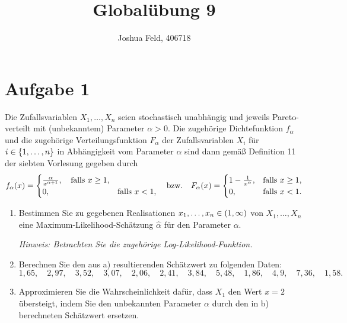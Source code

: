\documentclass{exercise}
\institute{Institut für Statistik und Wirtschaftsmathematik}
\title{Globalübung 9}
\author{Joshua Feld, 406718}
\begin{document}
    \maketitle


    \section*{Aufgabe 1}

    \begin{problem}
        Die Zufallsvariablen \(X_1, \ldots, X_n\) seien stochastisch unabhängig und jeweils Pareto-verteilt mit (unbekanntem) Parameter \(\alpha > 0\).
        Die zugehörige Dichtefunktion \(f_\alpha\) und die zugehörige Verteilungsfunktion \(F_\alpha\) der Zufallsvariablen \(X_i\) für \(i \in \braces*{1, \ldots, n}\) in Abhängigkeit vom Parameter \(\alpha\) sind dann gemäß Definition 11 der siebten Vorlesung gegeben durch
        \[
            f_\alpha\parentheses*{x} = \begin{cases}
                \frac{\alpha}{x^{\alpha + 1}}, \quad \text{falls }x \ge 1,\\
                0, & \text{falls }x < 1,
            \end{cases} \quad \text{bzw.} \quad F_\alpha\parentheses*{x} = \begin{cases}
                1 - \frac{1}{x^\alpha}, & \text{falls }x \ge 1,\\
                0, & \text{falls }x < 1.
            \end{cases}
        \]
        \begin{enumerate}
            \item Bestimmen Sie zu gegebenen Realisationen \(x_1, \ldots, x_n \in \parentheses*{1, \infty}\) von \(X_1, \ldots, X_n\) eine Maximum-Likelihood-Schätzung \(\hat{\alpha}\) für den Parameter \(\alpha\).
            
            \emph{Hinweis: Betrachten Sie die zugehörige Log-Likelihood-Funktion.}
            \item Berechnen Sie den aus a) resultierenden Schätzwert zu folgenden Daten:
            \[
                1,65, \quad 2,97, \quad 3,52, \quad 3,07, \quad 2,06, \quad 2,41, \quad 3,84, \quad 5,48, \quad 1,86, \quad 4,9, \quad 7,36, \quad 1,58.
            \]
            \item Approximieren Sie die Wahrscheinlichkeit dafür, dass \(X_1\) den Wert \(x = 2\) übersteigt, indem Sie den unbekannten Parameter \(\alpha\) durch den in b) berechneten Schätzwert ersetzen.
        \end{enumerate}
    \end{problem}
    
\end{document}
